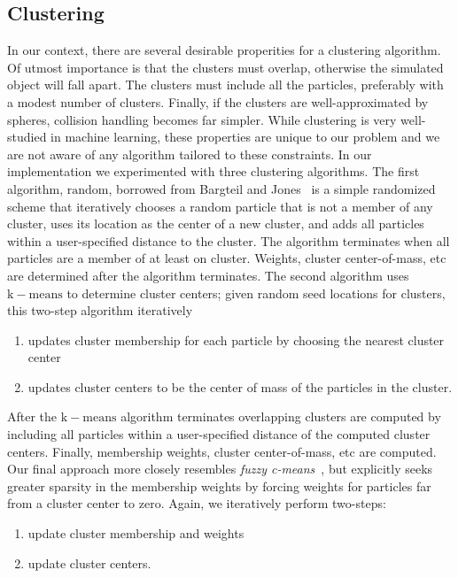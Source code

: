 \documentclass[review]{acmsiggraph}
\begin{document}
\subsection{Clustering}
In our context, there are several desirable properities for a clustering algorithm.  Of utmost importance is that the clusters must overlap, 
otherwise the simulated object will fall apart.  The clusters must include all the particles, preferably with a modest number of clusters.  
Finally, if the clusters are well-approximated by spheres, collision handling becomes far simpler.  While clustering is
very well-studied in machine learning, these properties are unique to our problem and we are not aware of any algorithm tailored to these
constraints.  
In our implementation we experimented with three clustering algorithms.  The first algorithm, $\mathrm{random}$,
borrowed from Bargteil and Jones~\shortcite{} is a simple randomized scheme that iteratively
chooses a random particle that is not a member of any cluster,
uses its location as the center of a new cluster, and adds all particles within a user-specified distance to the cluster.  
The algorithm terminates when all particles are a member of at least on cluster.  Weights, cluster center-of-mass, etc are
determined after the algorithm terminates.  
The second algorithm uses $\mathrm{k-means}$ to determine cluster centers; given random seed locations for clusters, this two-step algorithm iteratively
\begin{enumerate}
\item updates cluster membership for each particle by choosing the nearest cluster center
\item updates cluster centers to be the center of mass of the particles in the cluster.
\end{enumerate}
After the $\mathrm{k-means}$ algorithm terminates overlapping clusters are computed by including
all particles within a user-specified distance of the computed cluster centers.  Finally, membership weights, cluster center-of-mass, etc are computed.
Our final approach more closely resembles {\em fuzzy c-means}~\cite{}, but explicitly seeks greater sparsity in the membership weights by forcing
weights for particles far from a cluster center to zero.
Again, we iteratively perform two-steps:
\begin{enumerate}
\item update cluster membership and weights
\item update cluster centers.
\end{enumerate}
\end{document}
